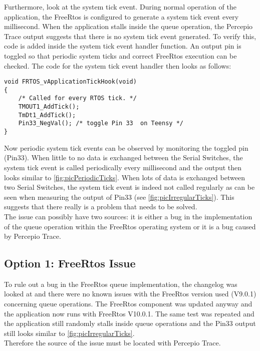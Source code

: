 Furthermore, look at the system tick event. During normal operation of the application, the FreeRtos is configured to generate a system tick event every millisecond. When the application stalls inside the queue operation, the Percepio Trace output suggests that there is no system tick event generated. To verify this, code is added inside the system tick event handler function. An output pin is toggled so that periodic system ticks and correct FreeRtos execution can be checked. The code for the system tick event handler then looks as follows:
\begin{lstlisting}
void FRTOS_vApplicationTickHook(void)
{
    /* Called for every RTOS tick. */
    TMOUT1_AddTick();
    TmDt1_AddTick();
    Pin33_NegVal(); /* toggle Pin 33  on Teensy */
}
\end{lstlisting}
Now periodic system tick events can be observed by monitoring the toggled pin (Pin33). When little to no data is exchanged between the Serial Switches, the system tick event is called periodically every millisecond and the output then looks similar to \autoref{fig:picPeriodicTicks}. When lots of data is exchanged between two Serial Switches, the system tick event is indeed not called regularly as can be seen when measuring the output of Pin33 (see \autoref{fig:picIrregularTicks}). This suggests that there really is a problem that needs to be solved.\\
%
%
The issue can possibly have two sources: it is either a bug in the implementation of the queue operation within the FreeRtos operating system or it is a bug caused by Percepio Trace.
%
\subsection{Option 1: FreeRtos Issue}
To rule out a bug in the FreeRtos queue implementation, the changelog was looked at and there were no known issues with the FreeRtos version used (V9.0.1) concerning queue operations. The FreeRtos component was updated anyway and the application now runs with FreeRtos V10.0.1. The same test was repeated and the application still randomly stalls inside queue operations and the Pin33 output still looks similar to \autoref{fig:picIrregularTicks}.\\
Therefore the source of the issue must be located with Percepio Trace.
%

